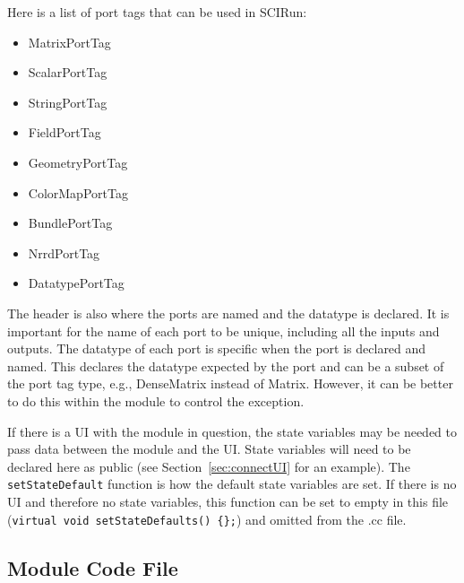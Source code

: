 \documentclass[fleqn,11pt,openany]{book}
\begin{document}
Here is a list of port tags that can be used in SCIRun:
\begin{itemize}
\item MatrixPortTag 
\item ScalarPortTag
\item StringPortTag
\item FieldPortTag
\item GeometryPortTag
\item ColorMapPortTag
\item BundlePortTag
\item NrrdPortTag
\item DatatypePortTag
\end{itemize}

The header is also where the ports are named and the datatype is declared.  
It is important for the name of each port to be unique, including all the inputs and outputs.  
The datatype of each port is specific when the port is declared and named.
This declares the datatype expected by the port and can be a subset of the port tag type, e.g., DenseMatrix instead of Matrix.
However, it can be better to do this within the module to control the exception.  

If there is a UI with the module in question, the state variables may be needed to pass data between the module and the UI.  
State variables will need to be declared here as public (see Section~\ref{sec:connectUI} for an example).  
The \verb|setStateDefault| function is how the default state variables are set.  
If there is no UI and therefore no state variables, this function can be set to empty in this file (\verb|virtual void setStateDefaults() {};|) and omitted from the .cc file.  

\subsection{Module Code File}
\label{sec:modulecc}
\end{document}
